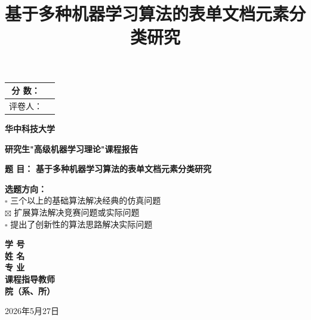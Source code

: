 \documentclass[12pt,a4paper]{article}
\title{\textbf{基于多种机器学习算法的表单文档元素分类研究}}
\author{}
\date{}
\begin{document}
\begin{titlepage}
    \centering

    \begin{tabular}{|c|c|}
        \hline
        分 \quad 数： & \\
        \hline
        评卷人： & \\
        \hline
    \end{tabular}

    \vspace{2cm}

    {\Huge \textbf{华中科技大学}}

    \vspace{1cm}

    {\huge \textbf{研究生"高级机器学习理论"课程报告}}

    \vspace{2cm}

    \begin{flushleft}
        \textbf{题 \quad 目：} \textbf{基于多种机器学习算法的表单文档元素分类研究} \\

        \vspace{0.5cm}

        \textbf{选题方向：} \\
        \hspace{1cm} $\square$ 三个以上的基础算法解决经典的仿真问题 \\
        \hspace{1cm} $\boxtimes$ 扩展算法解决竞赛问题或实际问题 \\
        \hspace{1cm} $\square$ 提出了创新性的算法思路解决实际问题 \\

        \vspace{1.5cm}

        \textbf{学 \qquad 号} \hrulefill \\
        \vspace{0.3cm}
        \textbf{姓 \qquad 名} \hrulefill \\
        \vspace{0.3cm}
        \textbf{专 \qquad 业} \hrulefill \\
        \vspace{0.3cm}
        \textbf{课程指导教师} \hrulefill \\
        \vspace{0.3cm}
        \textbf{院（系、所）} \hrulefill \\
    \end{flushleft}

    \vspace{2cm}

    {\Large 2026年5月27日}

\end{titlepage}
\end{document}
